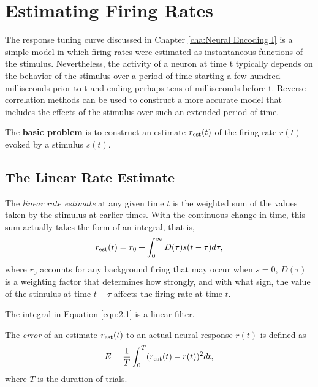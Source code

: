 \section{Estimating Firing Rates}
\label{sec:EstimatingFiringRates}

\begin{rem}
  The response tuning curve discussed in Chapter \ref{cha:Neural Encoding I} is a simple model in which firing rates were estimated as instantaneous functions of the stimulus. Nevertheless, the activity of a neuron at time t typically depends on the behavior of the stimulus over a period of time starting a few hundred milliseconds prior to t and ending perhaps tens of milliseconds before t. Reverse-correlation methods can be used to construct a more accurate model that includes the effects of the stimulus over such an extended period of time.
\end{rem}

\begin{rem}
  The \textbf{basic problem} is to construct an estimate $r_{\rm{est}}(t)$ of the firing rate $r(t)$ evoked by a stimulus $s(t)$.
\end{rem}

\subsection{The Linear Rate Estimate}

\begin{defn}
  \label{def:linearEstimate}
  The \emph{linear rate estimate} at any given time $t$ is the weighted sum of the values taken by the stimulus at earlier times. With the continuous change in time, this sum actually takes the form of an integral, that is,
  \begin{equation}
    \label{equ:2.1}
    r_{\rm{est}}(t) = r_0 + \int_0^{\infty}D(\tau) s(t-\tau)d\tau,
  \end{equation}
  where $r_0$ accounts for any background firing that may occur when $s = 0$, $D(\tau)$ is a weighting factor that determines how strongly,  and with what sign, the value of the stimulus at time $t-\tau$ affects the firing rate at time $t$.
\end{defn}

\begin{rem}
  The integral in Equation \ref{equ:2.1} is a linear filter.
\end{rem}

\begin{defn}
  \label{def:error}
  The \emph{error} of an estimate $r_{\rm{est}}(t)$ to an actual neural response $r(t)$ is defined as
  \begin{equation}
    \label{equ:2.3}
    E = \frac{1}{T}\int_0^T(r_{\rm{est}}(t)-r(t))^2dt,
  \end{equation}
  where $T$ is the duration of trials.
\end{defn}

